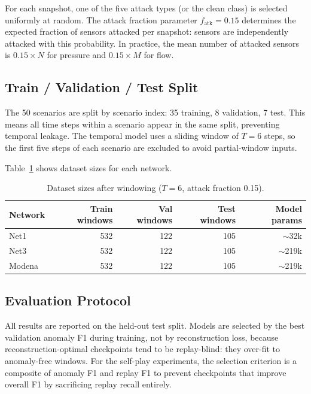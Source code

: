 For each snapshot, one of the five attack types (or the clean class)
is selected uniformly at random. The attack fraction parameter
$f_\text{atk} = 0.15$ determines the expected fraction of sensors
attacked per snapshot: sensors are independently attacked with this
probability. In practice, the mean number of attacked sensors is
$0.15 \times N$ for pressure and $0.15 \times M$ for flow.

\subsection{Train / Validation / Test Split}

The 50 scenarios are split by scenario index: 35 training, 8
validation, 7 test. This means all time steps within a scenario
appear in the same split, preventing temporal leakage. The temporal
model uses a sliding window of $T = 6$ steps, so the first five
steps of each scenario are excluded to avoid partial-window inputs.

Table~\ref{tab:dataset_stats} shows dataset sizes for each network.

\begin{table}[htbp]
  \centering
  \caption{Dataset sizes after windowing ($T = 6$, attack fraction 0.15).}
  \label{tab:dataset_stats}
  \begin{tabular}{lrrrr}
    \toprule
    Network & Train windows & Val windows & Test windows & Model params \\
    \midrule
    Net1    & 532 & 122 & 105 & $\sim$32k \\
    Net3    & 532 & 122 & 105 & $\sim$219k \\
    Modena  & 532 & 122 & 105 & $\sim$219k \\
    \bottomrule
  \end{tabular}
\end{table}

\subsection{Evaluation Protocol}

All results are reported on the held-out test split. Models are
selected by the best validation anomaly F1 during training, not by
reconstruction loss, because reconstruction-optimal checkpoints
tend to be replay-blind: they over-fit to anomaly-free windows.
For the self-play experiments, the selection criterion is a composite
of anomaly F1 and replay F1 to prevent checkpoints that improve
overall F1 by sacrificing replay recall entirely.

